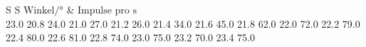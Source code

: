 \begin{table}[H]
  \centering
  \caption{Messwerte des Absorptionsspektrums von Strontium}
  \label{tab:tabe4}
    \begin{tabular}{S S}
    \toprule
    $ \text{Winkel} / ° $ & $ \text{Impulse pro s}$\\
    	23.0
    20.8	24.0
    21.0	27.0
    21.2	26.0
    21.4	34.0
    21.6	45.0
    21.8	62.0
    22.0	72.0
    22.2	79.0
    22.4	80.0
    22.6	81.0
    22.8	74.0
    23.0	75.0
    23.2	70.0
    23.4	75.0

          \bottomrule
        \end{tabular}
    \end{table}
